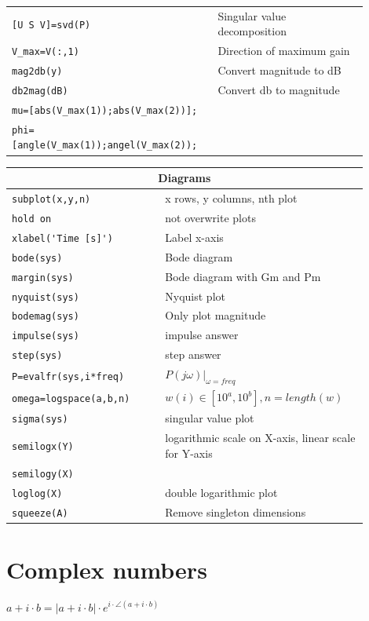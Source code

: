\documentclass[10pt,a4paper]{scrartcl}
\begin{document}
\begin{multicols*}{3}
\begin{tabular}{p{0.5\linewidth}p{0.4\linewidth}}
	\verb+[U S V]=svd(P)+&Singular value decomposition\\
	\verb+V_max=V(:,1)+&Direction of maximum gain\\
	\verb+mag2db(y)+&Convert magnitude to dB\\
	\verb+db2mag(dB)+&Convert db to magnitude\\
	\verb+mu=[abs(V_max(1));abs(V_max(2))];+\\
	\verb+phi=[angle(V_max(1));angel(V_max(2));+
	\end{tabular}
	\begin{tabular}{p{0.4\linewidth}p{0.5\linewidth}}
	\hline
	\multicolumn{2}{c}{Diagrams}\\
	\hline
	\hline
	\verb+subplot(x,y,n)+&x rows, y columns, nth plot\\
	\verb+hold on+&not overwrite plots\\
	\verb+xlabel('Time [s]')+&Label x-axis\\
	\verb+bode(sys)+&Bode diagram\\
	\verb+margin(sys)+&Bode diagram with Gm and Pm\\
	\verb+nyquist(sys)+&Nyquist plot\\
	\verb+bodemag(sys)+&Only plot magnitude\\
	\verb+impulse(sys)+&impulse answer\\
	\verb+step(sys)+&step answer\\
	\verb+P=evalfr(sys,i*freq)+&$P(j\omega)|_{\omega=freq}$\\
	\verb+omega=logspace(a,b,n)+&$w(i)\in[10^a,10^b], n=length(w)$\\
	\verb+sigma(sys)+&singular value plot\\
	\verb+semilogx(Y)+&logarithmic scale on X-axis, linear scale for Y-axis\\
	\verb+semilogy(X)+&\\
	\verb+loglog(X)+&double logarithmic plot\\
	\verb+squeeze(A)+&Remove singleton dimensions\\
	\end{tabular}
	\normalsize
	
	\section{Complex numbers}
	
	\begin{center}
	$a+i\cdot b=|a+i\cdot b|\cdot e^{i\cdot\angle(a+i\cdot b)}$

	\finn
	

\end{center}
\end{multicols*}
\end{document}
